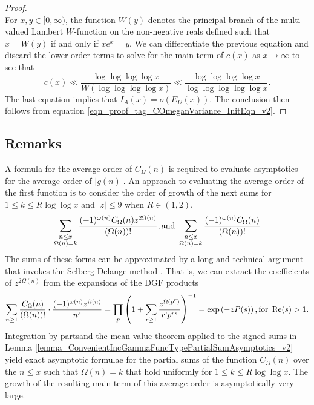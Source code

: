 \documentclass[11pt,reqno,a4letter]{article}
\newcommand{\hlocalref}[1]{\hyperref[#1]{\ref{#1}}}
\numberwithin{equation}{section}
\numberwithin{figure}{section}
\numberwithin{table}{section}
\theoremstyle{plain}
\numberwithin{theorem}{section}
\theoremstyle{definition}
\theoremstyle{remark}
\renewcommand{\Re}{\operatorname{Re}}
\newcommand{\mathtext}[1]{\text{\rm #1}}
\begin{document}
\begin{proof}
\[\]
For $x,y \in [0, \infty)$, the function $W(y)$ 
denotes the principal branch of the multi-valued 
Lambert $W$-function on the non-negative reals defined such that 
$x = W(y)$ if and only if $xe^{x} = y$. 
We can differentiate the previous equation and discard the lower order terms to solve 
for the main term of $c(x)$ as $x \rightarrow \infty$ to see that 
\[
c(x) \ll \frac{\log\log\log\log x}{W\left(\log\log\log\log x\right)} \ll 
	\frac{\log\log\log\log x}{\log\log\log\log\log x}.
\]
The last equation implies that $I_A(x) = o\left(E_{\Omega}(x)\right)$. 
The conclusion then follows from equation \eqref{eqn_proof_tag_COmeganVariance_InitEqn_v2}. 
\end{proof}

\subsection{Remarks} 
\label{subSection_RemarksOnAvgOrderFor_COmegan_directly_SelbergDelangeMethod} 

A formula for the average order of $C_{\Omega}(n)$ is required 
to evaluate asymptotics for the average order of $|g(n)|$. 
An approach to evaluating the average order of the first function 
is to consider the order of growth of the next sums 
for $1 \leq k \leq R \log\log x$ and $|z| \leq 9$ when $R \in (1, 2)$. 
\[
\sum_{\substack{n \leq x \\ \Omega(n)=k}} \frac{(-1)^{\omega(n)} 
     C_{\Omega}(n) z^{2\Omega(n)}}{(\Omega(n))!}, \mathtext{ and } 
     \sum_{\substack{n \leq x \\ \Omega(n)=k}} \frac{(-1)^{\omega(n)} 
     C_{\Omega}(n)}{(\Omega(n))!} 
\]
The sums of these forms can be approximated by a 
long and technical argument that invokes the Selberg-Delange method 
\cite[\S II.6.1]{TENENBAUM-PROBNUMT-METHODS} \cite[\S 7.4]{MV}. 
That is, we can extract the coefficients of $z^{2\Omega(n)}$ 
from the expansions of the DGF products 
\[
\sum_{n \geq 1} \frac{C_{\Omega}(n)}{(\Omega(n))!} \cdot 
     \frac{(-1)^{\omega(n)} z^{\Omega(n)}}{n^s} = \prod_p \left(1 + \sum_{r \geq 1} 
     \frac{z^{\Omega(p^r)}}{r! p^{rs}}\right)^{-1} 
     = \exp\left(-z P(s)\right), \mathtext{ for } \Re(s) > 1. 
\]
Integration by partsand the mean value theorem applied to the 
signed sums in Lemma \hlocalref{lemma_ConvenientIncGammaFuncTypePartialSumAsymptotics_v2} 
yield exact asymptotic formulae for the partial sums of 
the function $C_{\Omega}(n)$ over the $n \leq x$ such that $\Omega(n) = k$ that hold 
uniformly for $1 \leq k \leq R \log\log x$. 
The growth of the resulting main term of this 
average order is asymptotically very large.
\end{document}
